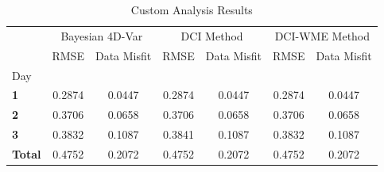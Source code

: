 \begin{table}[h!]
\caption{Custom Analysis Results}
\label{tab:custom_results}
\begin{tabular}{l|cc|cc|cc}
\toprule
 & \multicolumn{2}{c}{Bayesian 4D-Var} & \multicolumn{2}{c}{DCI Method} & \multicolumn{2}{c}{DCI-WME Method} \\
 & RMSE & Data Misfit & RMSE & Data Misfit & RMSE & Data Misfit \\
Day &  &  &  &  &  &  \\
\midrule
\textbf{1} & 0.2874 & 0.0447 & 0.2874 & 0.0447 & 0.2874 & 0.0447 \\
\textbf{2} & 0.3706 & 0.0658 & 0.3706 & 0.0658 & 0.3706 & 0.0658 \\
\textbf{3} & 0.3832 & 0.1087 & 0.3841 & 0.1087 & 0.3832 & 0.1087 \\
\textbf{Total} & 0.4752 & 0.2072 & 0.4752 & 0.2072 & 0.4752 & 0.2072 \\
\bottomrule
\end{tabular}
\end{table}

